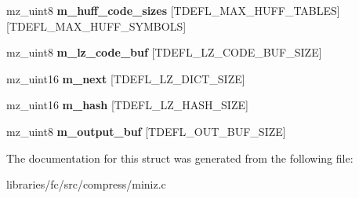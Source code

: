 \begin{DoxyCompactItemize}
mz\+\_\+uint8 {\bfseries m\+\_\+huff\+\_\+code\+\_\+sizes} \mbox{[}T\+D\+E\+F\+L\+\_\+\+M\+A\+X\+\_\+\+H\+U\+F\+F\+\_\+\+T\+A\+B\+L\+ES\mbox{]}\mbox{[}T\+D\+E\+F\+L\+\_\+\+M\+A\+X\+\_\+\+H\+U\+F\+F\+\_\+\+S\+Y\+M\+B\+O\+LS\mbox{]}
\item 
\mbox{\label{structtdefl__compressor_ac4233d89f25c3f5f9c9eda73bcf3e6c4}} 
mz\+\_\+uint8 {\bfseries m\+\_\+lz\+\_\+code\+\_\+buf} \mbox{[}T\+D\+E\+F\+L\+\_\+\+L\+Z\+\_\+\+C\+O\+D\+E\+\_\+\+B\+U\+F\+\_\+\+S\+I\+ZE\mbox{]}
\item 
\mbox{\label{structtdefl__compressor_aa55f0314f4b7bfff6999060bdf2d96fc}} 
mz\+\_\+uint16 {\bfseries m\+\_\+next} \mbox{[}T\+D\+E\+F\+L\+\_\+\+L\+Z\+\_\+\+D\+I\+C\+T\+\_\+\+S\+I\+ZE\mbox{]}
\item 
\mbox{\label{structtdefl__compressor_a2dffbb84dd4d9bf24bc3b1476cbd636c}} 
mz\+\_\+uint16 {\bfseries m\+\_\+hash} \mbox{[}T\+D\+E\+F\+L\+\_\+\+L\+Z\+\_\+\+H\+A\+S\+H\+\_\+\+S\+I\+ZE\mbox{]}
\item 
\mbox{\label{structtdefl__compressor_af3767449a43c686c7870b4bf939c878a}} 
mz\+\_\+uint8 {\bfseries m\+\_\+output\+\_\+buf} \mbox{[}T\+D\+E\+F\+L\+\_\+\+O\+U\+T\+\_\+\+B\+U\+F\+\_\+\+S\+I\+ZE\mbox{]}
\end{DoxyCompactItemize}


The documentation for this struct was generated from the following file\+:\begin{DoxyCompactItemize}
\item 
libraries/fc/src/compress/miniz.\+c\end{DoxyCompactItemize}
